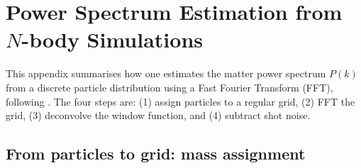 \documentclass[12pt]{article}
\begin{document}
\section{Power Spectrum Estimation from $N$-body Simulations}
\label{app:pk}

This appendix summarises how one estimates the matter power spectrum
$P(k)$ from a discrete particle distribution using a Fast Fourier
Transform (FFT), following \citet{Jeong2010}.  The four steps are:
(1) assign particles to a regular grid, (2) FFT the grid,
(3) deconvolve the window function, and (4) subtract shot noise.

\subsection{From particles to grid: mass assignment}
\label{app:pk_assign}
\end{document}

